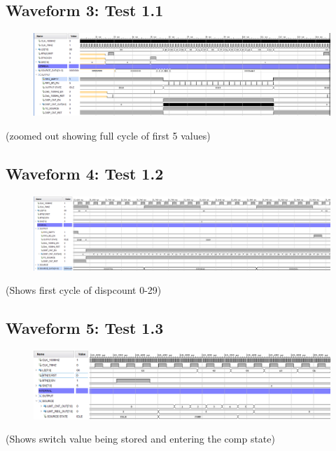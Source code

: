 \documentclass[11pt]{report}
\begin{document}
\subsection*{Waveform 3: Test 1.1 }
\begin{figure}[H]
       \includegraphics[width=\columnwidth]{Assets/Test1_1.png}
\end{figure}

(zoomed out showing full cycle of first 5 values)

\subsection*{Waveform 4: Test 1.2 }
\begin{figure}[H]
       \includegraphics[width=\columnwidth]{Assets/Test1_2.png}
\end{figure}

(Shows first cycle of dispcount 0-29)

\subsection*{Waveform 5: Test 1.3 }
\begin{figure}[H]
       \includegraphics[width=\columnwidth]{Assets/Test1_3.png}
\end{figure}

(Shows switch value being stored and entering the comp state)
\end{document}

